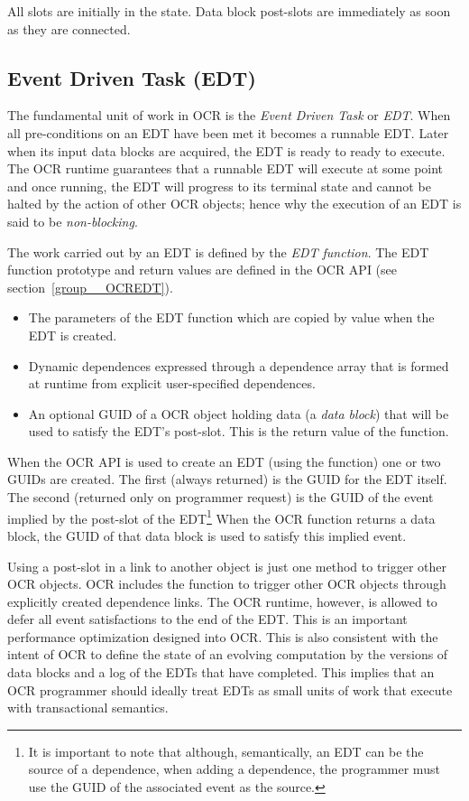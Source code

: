 All slots are initially in the  state. Data
block post-slots are immediately  as soon as they are
connected.

\subsection{Event Driven Task (EDT)}
\label{sec:EDT}

The fundamental unit of work in OCR is
the \emph{Event Driven Task} or \emph{EDT}.
When all pre-conditions on an EDT have been met it becomes a runnable EDT.
Later when its
input data blocks are acquired, the EDT is ready to ready to execute.  The OCR
runtime guarantees that a runnable EDT will execute at some point and once running,
the EDT will progress to its terminal state
and cannot be halted by the action of other OCR objects; hence why the
execution of an EDT is said to be \emph{non-blocking}.

The work carried out by an EDT is defined by
the \emph{EDT function}. The EDT function prototype
and return values are defined in the OCR API (see section~\ref{group__OCREDT}).
\begin{itemize}
\item The parameters of the EDT function which are copied by value
when the EDT is created.
\item Dynamic dependences expressed through a dependence array that is
formed at runtime from explicit user-specified dependences.
\item An optional GUID of a OCR object holding data (a \emph{data
block}) that will be used to satisfy the EDT’s post-slot. This is the
return value of the function.
\end{itemize}

When the OCR API is used to create an EDT (using the  function)
one or two GUIDs are created.  The first (always returned) is the GUID for the EDT itself.
The second (returned only on programmer request) is the GUID of the
event implied by the post-slot of the EDT\footnote{It is important to
note that although, semantically, an EDT can be the source of a
dependence, when adding a dependence, the programmer must use the
GUID of the associated event as the source.}
When the OCR function returns a data block, the GUID of
that data block is used to satisfy this implied event.

Using a post-slot in a link to another object is just one method to
trigger other OCR objects. OCR includes the 
function to trigger other OCR objects through explicitly created dependence
links.  The OCR runtime, however, is allowed to defer all event satisfactions
to the end of the EDT.  This is an important performance optimization designed
into OCR.   This is also consistent with the intent of OCR to define the state
of an evolving computation by the versions of data blocks and a log of the
EDTs that have completed.   This implies that an OCR programmer should
ideally treat EDTs as small units of work that execute with transactional
semantics.

